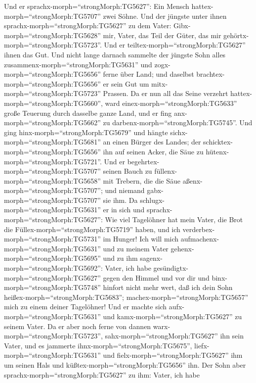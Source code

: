  Und er sprachx-morph=``strongMorph:TG5627'': Ein Mensch
hattex-morph=``strongMorph:TG5707'' zwei Söhne.  Und der
jüngste unter ihnen sprachx-morph=``strongMorph:TG5627'' zu dem Vater:
Gibx-morph=``strongMorph:TG5628'' mir, Vater, das Teil der Güter, das
mir gehörtx-morph=``strongMorph:TG5723''. Und er
teiltex-morph=``strongMorph:TG5627'' ihnen das Gut.  Und
nicht lange darnach sammelte der jüngste Sohn alles
zusammenx-morph=``strongMorph:TG5631'' und
zogx-morph=``strongMorph:TG5656'' ferne über Land; und daselbst
brachtex-morph=``strongMorph:TG5656'' er sein Gut um
mitx-morph=``strongMorph:TG5723'' Prassen.  Da er nun all
das Seine verzehrt hattex-morph=``strongMorph:TG5660'', ward
einex-morph=``strongMorph:TG5633'' große Teuerung durch dasselbe ganze
Land, und er fing anx-morph=``strongMorph:TG5662'' zu
darbenx-morph=``strongMorph:TG5745''.  Und ging
hinx-morph=``strongMorph:TG5679'' und hängte
sichx-morph=``strongMorph:TG5681'' an einen Bürger des Landes; der
schicktex-morph=``strongMorph:TG5656'' ihn auf seinen Acker, die Säue zu
hütenx-morph=``strongMorph:TG5721''.  Und er
begehrtex-morph=``strongMorph:TG5707'' seinen Bauch zu
füllenx-morph=``strongMorph:TG5658'' mit Trebern, die die Säue
aßenx-morph=``strongMorph:TG5707''; und niemand
gabx-morph=``strongMorph:TG5707'' sie ihm.  Da
schlugx-morph=``strongMorph:TG5631'' er in sich und
sprachx-morph=``strongMorph:TG5627'': Wie viel Tagelöhner hat mein
Vater, die Brot die Füllex-morph=``strongMorph:TG5719'' haben, und ich
verderbex-morph=``strongMorph:TG5731'' im Hunger!  Ich will
mich aufmachenx-morph=``strongMorph:TG5631'' und zu meinem Vater
gehenx-morph=``strongMorph:TG5695'' und zu ihm
sagenx-morph=``strongMorph:TG5692'': Vater, ich habe
gesündigtx-morph=``strongMorph:TG5627'' gegen den Himmel und vor dir
 und binx-morph=``strongMorph:TG5748'' hinfort nicht mehr
wert, daß ich dein Sohn heißex-morph=``strongMorph:TG5683'';
machex-morph=``strongMorph:TG5657'' mich zu einem deiner Tagelöhner!
 Und er machte sich aufx-morph=``strongMorph:TG5631'' und
kamx-morph=``strongMorph:TG5627'' zu seinem Vater. Da er aber noch ferne
von dannen warx-morph=``strongMorph:TG5723'',
sahx-morph=``strongMorph:TG5627'' ihn sein Vater, und es jammerte
ihnx-morph=``strongMorph:TG5675'', liefx-morph=``strongMorph:TG5631''
und fielx-morph=``strongMorph:TG5627'' ihm um seinen Hals und
küßtex-morph=``strongMorph:TG5656'' ihn.  Der Sohn aber
sprachx-morph=``strongMorph:TG5627'' zu ihm: Vater, ich habe
